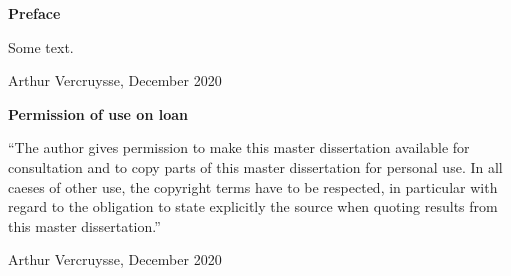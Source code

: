 
\newpage

\noindent \textbf{\huge Preface}

\vspace{1.5cm}

\noindent
Some text.

\addvspace{4cm}

\noindent Arthur Vercruysse, December 2020\newpage

\noindent \textbf{\huge Permission of use on loan}

\vspace{1.5cm}

\noindent
``The author gives permission to make this master dissertation available for consultation and to copy parts
of this master dissertation for personal use. In all caeses of other use, the copyright terms have to be respected,
in particular with regard to the obligation to state explicitly the source when quoting results from this master
dissertation.''

\addvspace{4cm}

\noindent Arthur Vercruysse, December 2020

